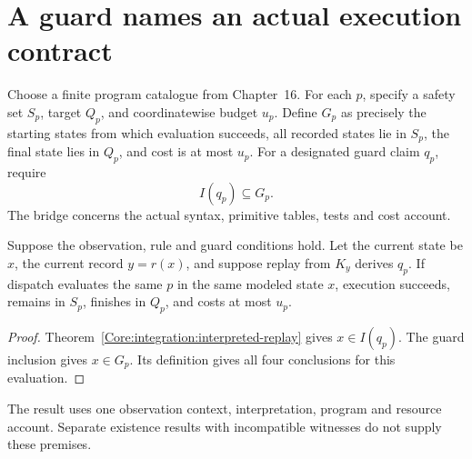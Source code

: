\section{A guard names an actual execution contract}
Choose a finite program catalogue from Chapter~16. For each $p$, specify a safety set $S_p$, target $Q_p$, and coordinatewise budget $u_p$. Define $G_p$ as precisely the starting states from which evaluation succeeds, all recorded states lie in $S_p$, the final state lies in $Q_p$, and cost is at most $u_p$. For a designated guard claim $q_p$, require
\begin{equation}\label{Core:integration:guard}
I(q_p)\subseteq G_p.
\end{equation}
The bridge concerns the actual syntax, primitive tables, tests and cost account.

\begin{Coretheorem}
Suppose the observation, rule and guard conditions hold. Let the current state be $x$, the current record $y=r(x)$, and suppose replay from $K_y$ derives $q_p$. If dispatch evaluates the same $p$ in the same modeled state $x$, execution succeeds, remains in $S_p$, finishes in $Q_p$, and costs at most $u_p$.
\end{Coretheorem}
\begin{proof}
Theorem~\ref{Core:integration:interpreted-replay} gives $x\in I(q_p)$. The guard inclusion gives $x\in G_p$. Its definition gives all four conclusions for this evaluation.
\end{proof}
The result uses one observation context, interpretation, program and resource account. Separate existence results with incompatible witnesses do not supply these premises.

